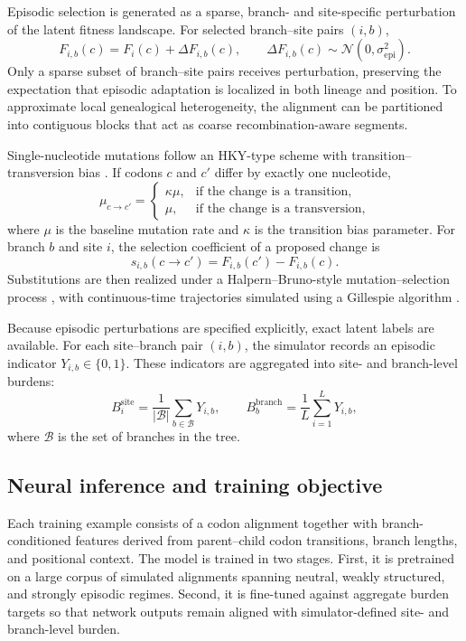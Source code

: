 \documentclass[11pt]{article}
\begin{document}
Episodic selection is generated as a sparse, branch- and site-specific perturbation of the latent fitness landscape. For selected branch--site pairs $(i,b)$,
\[
F_{i,b}(c)=F_i(c)+\Delta F_{i,b}(c),
\qquad
\Delta F_{i,b}(c)\sim \mathcal{N}(0,\sigma_{\mathrm{epi}}^2).
\]
Only a sparse subset of branch--site pairs receives perturbation, preserving the expectation that episodic adaptation is localized in both lineage and position. To approximate local genealogical heterogeneity, the alignment can be partitioned into contiguous blocks that act as coarse recombination-aware segments.

Single-nucleotide mutations follow an HKY-type scheme with transition--transversion bias \cite{Hasegawa1985}. If codons $c$ and $c'$ differ by exactly one nucleotide,
\[
\mu_{c\rightarrow c'}=
\begin{cases}
\kappa\mu, & \text{if the change is a transition},\\
\mu, & \text{if the change is a transversion},
\end{cases}
\]
where $\mu$ is the baseline mutation rate and $\kappa$ is the transition bias parameter. For branch $b$ and site $i$, the selection coefficient of a proposed change is
\[
s_{i,b}(c\rightarrow c')=F_{i,b}(c')-F_{i,b}(c).
\]
Substitutions are then realized under a Halpern--Bruno-style mutation--selection process \cite{HalpernBruno1998}, with continuous-time trajectories simulated using a Gillespie algorithm \cite{Gillespie1977}.

Because episodic perturbations are specified explicitly, exact latent labels are available. For each site--branch pair $(i,b)$, the simulator records an episodic indicator $Y_{i,b}\in\{0,1\}$. These indicators are aggregated into site- and branch-level burdens:
\[
B_i^{\mathrm{site}}=\frac{1}{|\mathcal{B}|}\sum_{b\in\mathcal{B}} Y_{i,b},
\qquad
B_b^{\mathrm{branch}}=\frac{1}{L}\sum_{i=1}^{L} Y_{i,b},
\]
where $\mathcal{B}$ is the set of branches in the tree.

\subsection{Neural inference and training objective}

Each training example consists of a codon alignment together with branch-conditioned features derived from parent--child codon transitions, branch lengths, and positional context. The model is trained in two stages. First, it is pretrained on a large corpus of simulated alignments spanning neutral, weakly structured, and strongly episodic regimes. Second, it is fine-tuned against aggregate burden targets so that network outputs remain aligned with simulator-defined site- and branch-level burden.
\end{document}
